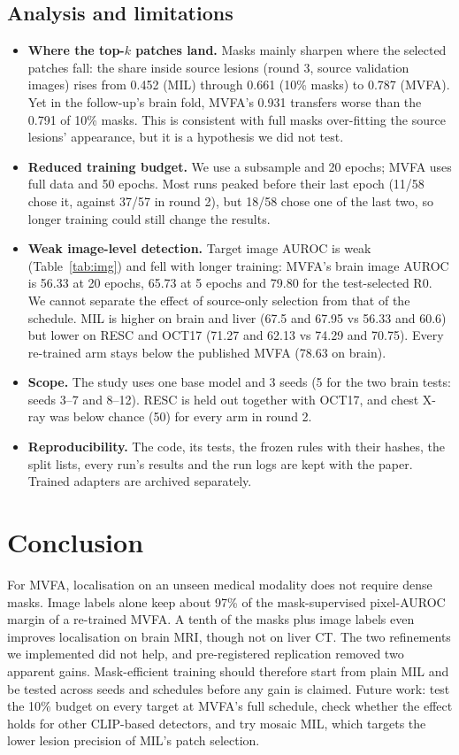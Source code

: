 \documentclass[10pt,twocolumn,letterpaper]{article}
\begin{document}
\subsection{Analysis and limitations}
\begin{itemize}
\item \textbf{Where the top-$k$ patches land.} Masks mainly sharpen where the selected patches fall: the share inside source lesions (round 3, source validation images) rises from 0.452 (MIL) through 0.661 (10\% masks) to 0.787 (MVFA). Yet in the follow-up's brain fold, MVFA's 0.931 transfers worse than the 0.791 of 10\% masks. This is consistent with full masks over-fitting the source lesions' appearance, but it is a hypothesis we did not test.
\item \textbf{Reduced training budget.} We use a subsample and 20 epochs; MVFA uses full data and 50 epochs. Most runs peaked before their last epoch (11/58 chose it, against 37/57 in round 2), but 18/58 chose one of the last two, so longer training could still change the results.
\item \textbf{Weak image-level detection.} Target image AUROC is weak (Table~\ref{tab:img}) and fell with longer training: MVFA's brain image AUROC is 56.33 at 20 epochs, 65.73 at 5 epochs and 79.80 for the test-selected R0. We cannot separate the effect of source-only selection from that of the schedule. MIL is higher on brain and liver (67.5 and 67.95 vs 56.33 and 60.6) but lower on RESC and OCT17 (71.27 and 62.13 vs 74.29 and 70.75). Every re-trained arm stays below the published MVFA (78.63 on brain).
\item \textbf{Scope.} The study uses one base model and 3 seeds (5 for the two brain tests: seeds 3--7 and 8--12). RESC is held out together with OCT17, and chest X-ray was below chance (50) for every arm in round 2.
\item \textbf{Reproducibility.} The code, its tests, the frozen rules with their hashes, the split lists, every run's results and the run logs are kept with the paper. Trained adapters are archived separately.
\end{itemize}

\section{Conclusion}
\label{sec:conclusion}
For MVFA, localisation on an unseen medical modality does not require dense masks. Image labels alone keep about 97\% of the mask-supervised pixel-AUROC margin of a re-trained MVFA. A tenth of the masks plus image labels even improves localisation on brain MRI, though not on liver CT. The two refinements we implemented did not help, and pre-registered replication removed two apparent gains. Mask-efficient training should therefore start from plain MIL and be tested across seeds and schedules before any gain is claimed. Future work: test the 10\% budget on every target at MVFA's full schedule, check whether the effect holds for other CLIP-based detectors, and try mosaic MIL, which targets the lower lesion precision of MIL's patch selection.


\clearpage
{\small


}
\end{document}
